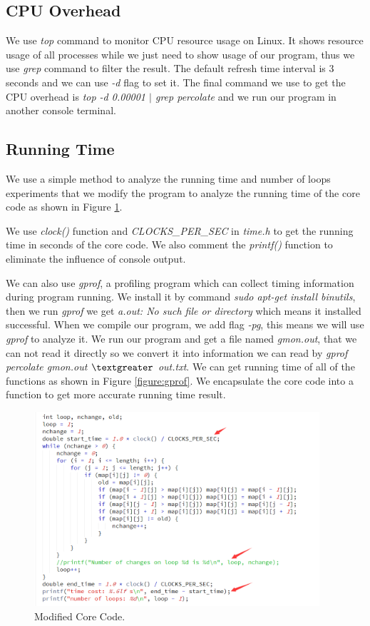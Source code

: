 \documentclass{article}
\begin{document}
\subsection{CPU Overhead}
We use \emph{top} command to monitor CPU resource usage on Linux. It shows resource usage of all processes while we just need to show usage of our program, thus we use \emph{grep}  command to filter the result. The default refresh time interval is 3 seconds and we can use \emph{-d} flag to set it. The final command we use to get the CPU overhead is \emph{top -d 0.00001 $\mid$ grep percolate} and we run our program in another console terminal.

\subsection{Running Time}
We use a simple method to analyze the running time and number of loops experiments that we modify the program to analyze the running time of the core code as shown in Figure \ref{figure:code}. 

We use \emph{clock()} function and \emph{CLOCKS\_PER\_SEC} in \emph{time.h} to get the running time in seconds of the core code. We also comment the \emph{printf()} function to eliminate the influence of console output. 

We can also use \emph{gprof}, a profiling program which can collect timing information during program running. We install it by command \emph{sudo apt-get install binutils}, then we run \emph{gprof} we get \emph{a.out: No such file or directory} which means it installed successful. When we compile our program, we add flag \emph{-pg}, this means we will use \emph{gprof} to analyze it. We run our program and get a file named \emph{gmon.out}, that we can not read it directly so we convert it into information we can read by \emph{gprof percolate gmon.out $\textgreater$ out.txt}. We can get running time of all of the functions as shown in Figure \ref{figure:gprof}. We encapsulate the core code into a function to get more accurate running time result.

\begin{figure}[H]
  \centering
  \centerline{\includegraphics[width=300pt]{1.png}}
  \caption{Modified Core Code.}
\label{figure:code}
\end{figure}
\end{document}
